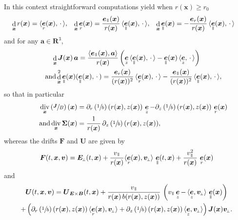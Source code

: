 \documentclass[10pt]{amsart}
\newcommand{\sperp}{{\scriptscriptstyle\perp}}
\let\d\partial
\DeclareMathOperator\dD{d}\let\dd\dD
\DeclareMathOperator{\Div}{div}
\theoremstyle{plain}
\theoremstyle{definition}
\newcommand\R{\mathbf R}
\newcommand\bB{{\boldsymbol B}}
\newcommand\bE{{\boldsymbol E}}
\newcommand\bF{{\boldsymbol F}}
\newcommand\bJ{{\boldsymbol J}}
\newcommand\bU{{\boldsymbol U}}
\let\bfF\bF
\let\bfU\bU
\newcommand\bfa{{\boldsymbol a}}
\newcommand\bfv{{\boldsymbol v}}
\newcommand\bfx{{\boldsymbol x}}
\newcommand\Sig{{\boldsymbol \Sigma}}
\DeclareMathOperator{\beD}{\boldsymbol{e}}
\newcommand\eDr{\beD_r}
\newcommand\eDz{\beD_z}
\newcommand\eDpar{\beD_\mypar}
\newcommand\vpar{v_\mypar}
\newcommand\bvperp{\bfv_{\!\sperp}}
\newcommand\Eperp{\bE_{\!\sperp}}
\newcommand{\EcB}{\bU_{\bE\times\bB}}
\newcommand{\mypar}{{\mkern3mu\vphantom{\perp}\vrule depth 0pt\mkern2mu\vrule depth 0pt\mkern3mu}}
\begin{document}
In this context straightforward computations yield when $r(\bfx)\geq r_0$
\begin{align*}
\dD_\bfx r(\bfx)&=\langle\eDr(\bfx),\,\cdot\,\rangle,&
\dD_\bfx \eDr(\bfx)&=\frac{\eDpar(\bfx)}{r(\bfx)}\,\langle\eDpar(\bfx),\,\cdot\,\rangle,&
\dD_\bfx \eDpar(\bfx)&=-\frac{\eDr(\bfx)}{r(\bfx)}\,\langle\eDpar(\bfx),\,\cdot\,\rangle
\end{align*}
and for any $\bfa\in\R^3$,
\begin{gather*}
\dD_\bfx\bJ(\bfx)\,\bfa
=\frac{\langle\eDpar(\bfx),\bfa\rangle}{r(\bfx)}
\left(\eDz\,\langle\eDpar(\bfx),\,\cdot\,\rangle
-\eDpar(\bfx)\,\langle\eDz,\,\cdot\,\rangle\right)
\\
\tag*{and}
\dD_\bfx^2\eDpar(\bfx)(\eDpar(\bfx),\,\cdot\,)
=\frac{\eDr(\bfx)}{(r(\bfx))^2}\,\langle\eDr(\bfx),\,\cdot\,\rangle
-\frac{\eDpar(\bfx)}{(r(\bfx))^2}\,\langle\eDpar(\bfx),\,\cdot\,\rangle,
\end{gather*}
so that in particular
\begin{align*}
\Div_{\bfx}\left(\sfrac{\bJ}{B}\right)(\bfx) &=\d_r\left(\sfrac1b\right)(r(\bfx),z(\bfx))\,\eDz
-\d_z\left(\sfrac1b\right)(r(\bfx),z(\bfx))\,\eDr(\bfx)
\\
\tag*{and}
\Div_\bfx\Sig(\bfx)
&=\frac{1}{r(\bfx)}\,\d_z\left(\sfrac1b\right)(r(\bfx),z(\bfx)),
\end{align*}
whereas the drifts $\bfF$ and $\bfU$ are given by
\[
\bF(t,\bfx,\bfv) = \Eperp(t,\bfx)
+\frac{\vpar}{r(\bfx)}\langle \eDr(\bfx),\bvperp\rangle\,\eDpar(t,\bfx)
+\frac{\vpar^2}{r(\bfx)}\,\eDr(\bfx)
\]
and
\begin{multline*}
\bU(t,\bfx,\bfv)
= \EcB(t,\bfx)
+\frac{\vpar}{r(\bfx)\,b(r(\bfx),z(\bfx))}\,\left(\vpar\eDz
-
\,\langle\eDz,\bvperp\rangle\,\eDpar(\bfx)\right)
\\
+\left(\d_r\left(\sfrac1b\right)(r(\bfx),z(\bfx))\,\langle\eDr(\bfx),\bvperp\rangle
+\d_z\left(\sfrac1b\right)(r(\bfx),z(\bfx))\,\langle\eDz,\bvperp\rangle\right)\bJ(\bfx)\bvperp.
\end{multline*}
\end{document}
